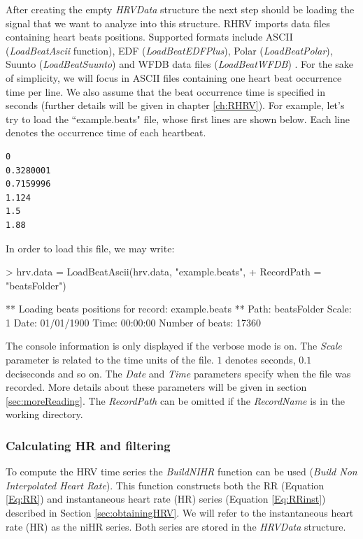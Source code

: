 \documentclass[12pt,lot, lof]{puthesis}
\begin{document}
After creating the empty \textit{HRVData} structure  the next step should be 
loading the signal that we want to analyze into this structure. RHRV imports 
data files containing heart beats positions. Supported formats include ASCII 
(\textit{LoadBeatAscii} function), EDF (\textit{LoadBeatEDFPlus}), Polar 
(\textit{LoadBeatPolar}), Suunto (\textit{LoadBeatSuunto}) and WFDB data files 
(\textit{LoadBeatWFDB}) \cite{mitbih}. For the sake of simplicity, we will 
focus in
ASCII files containing one heart beat occurrence time per line. We also assume 
that the beat occurrence time is specified in seconds (further details will be 
given in chapter \ref{ch:RHRV}). For example, let's try to load the 
``example.beats" file, whose first lines are shown below. Each line denotes
the occurrence time of each heartbeat.
\begin{verbatim}
0
0.3280001
0.7159996
1.124
1.5
1.88
\end{verbatim}
In order to load this file, we may write:
\begin{Schunk}
\begin{Sinput}
> hrv.data = LoadBeatAscii(hrv.data, "example.beats",
+        RecordPath = "beatsFolder")
\end{Sinput}
\begin{Soutput}
** Loading beats positions for record: example.beats **
   Path: beatsFolder 
   Scale: 1 
   Date: 01/01/1900
   Time: 00:00:00
   Number of beats: 17360 
\end{Soutput}
\end{Schunk}
The console information is only displayed if the verbose mode is on. The
\textit{Scale} parameter is related to the time units of the file. $1$
denotes seconds, $0.1$ deciseconds and so on. The \textit{Date} and 
\textit{Time}
parameters specify when the file was recorded. More details about these
parameters will be given in section \ref{sec:moreReading}. The 
\textit{RecordPath} can be omitted if the \textit{RecordName} is in the 
working directory.
\subsubsection{Calculating HR and filtering} To compute the HRV time series the 
\textit{BuildNIHR} function can be used (\textit{Build Non Interpolated Heart 
Rate}). This function constructs both the RR (Equation \ref{Eq:RR}) and 
instantaneous heart rate (\gls{HR}) series (Equation \ref{Eq:RRinst}) described 
in Section \ref{sec:obtainingHRV}. We will refer to the instantaneous heart 
rate (\gls{HR}) as the 
\gls{niHR} series. Both series are stored in the \textit{HRVData} structure.\\
\end{document}
